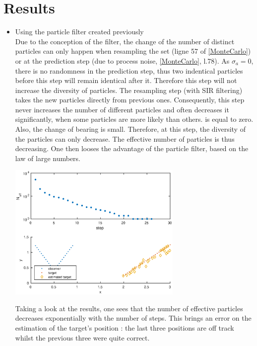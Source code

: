 \documentclass[english,DIV=13]{scrreprt}
\begin{document}
\section*{Results}
\begin{itemize}
\item Using the particle filter created previously\\
Due to the conception of the filter, the change of the number of distinct particles can only happen when resampling the set (ligne 57 of
\ref{MonteCarlo}) or at the prediction step (due to process noise, \ref{MonteCarlo}, l.78).
As $\sigma_a = 0$, there is no randomness in the prediction step, thus two indentical particles before this step will remain identical
after it. Therefore this step will not increase the diversity of particles.
The resampling step (with SIR filtering) takes the new particles directly from previous ones. Consequently, this step never
increases the number of different particles and often decreases it significantly, when some particles are more likely than others.
is equal to zero. Also, the change of bearing is small. Therefore, at this step,  the diversity of the particles can only decrease.
The effective number of particles is thus decreasing. One then looses the advantage of the particle filter, based on
the law of large numbers.\\
\begin{center}
 \includegraphics[width=0.66\textwidth]{img/q51.eps}
\end{center}
Taking a look at the results, one sees that the number of effective particles decreases exponentially with the number of steps.
This brings an error on the estimation of the target's position : the last three positions are off track whilst the previous three
were quite correct.


\end{itemize}
\end{document}
